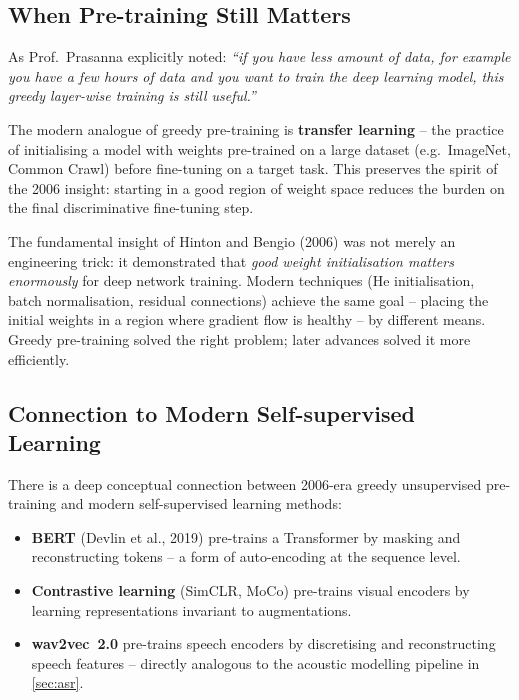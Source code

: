 \documentclass[12pt,a4paper]{article}
\begin{document}
\subsection{When Pre-training Still Matters}

As Prof.\ Prasanna explicitly noted: \emph{``if you have less amount of data,
for example you have a few hours of data and you want to train the deep
learning model, this greedy layer-wise training is still useful.''}

The modern analogue of greedy pre-training is \textbf{transfer learning} --
the practice of initialising a model with weights pre-trained on a large
dataset (e.g.\ ImageNet, Common Crawl) before fine-tuning on a target task.
This preserves the spirit of the 2006 insight: starting in a good region of
weight space reduces the burden on the final discriminative fine-tuning step.

\begin{keyinsight}[title=The Enduring Principle]
  The fundamental insight of Hinton and Bengio (2006) was not merely an
  engineering trick: it demonstrated that \emph{good weight initialisation
  matters enormously} for deep network training.  Modern techniques
  (He initialisation, batch normalisation, residual connections) achieve the
  same goal -- placing the initial weights in a region where gradient flow is
  healthy -- by different means.  Greedy pre-training solved the right
  problem; later advances solved it more efficiently.
\end{keyinsight}

\subsection{Connection to Modern Self-supervised Learning}

There is a deep conceptual connection between 2006-era greedy unsupervised
pre-training and modern self-supervised learning methods:

\begin{itemize}[leftmargin=*]
  \item \textbf{BERT} (Devlin et al., 2019) pre-trains a Transformer by
        masking and reconstructing tokens -- a form of auto-encoding at the
        sequence level.
  \item \textbf{Contrastive learning} (SimCLR, MoCo) pre-trains visual
        encoders by learning representations invariant to augmentations.
  \item \textbf{wav2vec~2.0} pre-trains speech encoders by discretising and
        reconstructing speech features -- directly analogous to the acoustic
        modelling pipeline in \cref{sec:asr}.
\end{itemize}
\end{document}
